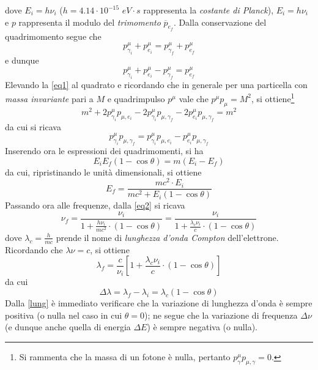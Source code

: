 \documentclass[a4paper, 12pt, oneside]{article}
\begin{document}
dove $E_i=h\nu_i$ ($h=4.14\cdot 10^{-15}\,\,\si{eV\cdot s}$ rappresenta la \emph{costante di Planck}), $E_i=h\nu_i$ e $p$ rappresenta il modulo del \emph{trimomento} $\overline{p}_{e_f}$. Dalla conservazione del quadrimomento segue che
\begin{displaymath}
p_{\gamma_i}^\mu+p_{e_i}^\mu=p_{\gamma_f}^\mu+p_{e_f}^\mu
\end{displaymath}
e dunque
\begin{equation}\label{eq1}
p_{\gamma_i}^\mu+p_{e_i}^\mu-p_{\gamma_f}^\mu=p_{e_f}^\mu
\end{equation}
Elevando la \eqref{eq1} al quadrato e ricordando che in generale per una particella con \emph{massa invariante} pari a $M$ e quadrimpulso $p^\mu$ vale che $p^\mu p_\mu = M^2$, si ottiene\footnote{Si rammenta che la massa di un fotone è nulla, pertanto $p_\gamma^\mu p_{\mu,\gamma} = 0$.}
\begin{displaymath}
m^2+2p_{\gamma_i}^\mu p_{\mu,e_i} - 2p_{\gamma_i}^\mu p_{\mu,\gamma_f}-2p_{e_i}^\mu p_{\mu,\gamma_f}=m^2
\end{displaymath}
da cui si ricava
\begin{displaymath}
p_{\gamma_i}^\mu p_{\mu,\gamma_f}=p_{\gamma_i}^\mu p_{\mu,e_i} -p_{e_i}^\mu p_{\mu,\gamma_f}
\end{displaymath}
Inserendo ora le espressioni dei quadrimomenti, si ha
\begin{displaymath}
E_iE_f\left(1-\cos\theta\right)=m\left(E_i-E_f\right)
\end{displaymath}
da cui, ripristinando le unità dimensionali, si ottiene
\begin{equation} \label{eq2}
E_f=\frac{mc^2\cdot E_i}{mc^2+E_i\left(1-\cos\theta\right)}
\end{equation}
Passando ora alle frequenze, dalla \eqref{eq2} si ricava
\begin{equation}
\nu_f=\displaystyle\frac{\nu_i}{1+\displaystyle\frac{h\nu_i}{mc^2}\cdot\left(1-\cos\theta\right)}=\displaystyle\frac{\nu_i}{1+\displaystyle\frac{\lambda_c\nu_i}{c}\cdot\left(1-\cos\theta\right)}
\end{equation}
dove $\lambda_c=\frac{h}{mc}$ prende il nome di \emph{lunghezza d'onda Compton} dell'elettrone. Ricordando che $\lambda\nu=c$, si ottiene
\begin{displaymath}
\lambda_f=\frac{c}{\nu_i}\left[1+\frac{\lambda_c\nu_i}{c}\cdot\left(1-\cos\theta\right)\right]
\end{displaymath}
da cui
\begin{equation}\label{lung}
\Delta\lambda=\lambda_f-\lambda_i=\lambda_c\left(1-\cos\theta\right)
\end{equation}
Dalla \eqref{lung} è immediato verificare che la variazione di lunghezza d'onda è sempre positiva (o nulla nel caso in cui $\theta=0$); ne segue che la variazione di frequenza $\Delta\nu$ (e dunque anche quella di energia $\Delta E$) è sempre negativa (o nulla).
\end{document}
